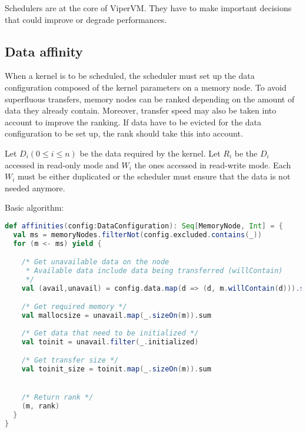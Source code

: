 Schedulers are at the core of ViperVM.
They have to make important decisions that could improve or degrade performances.

\subsection{Data affinity}
When a kernel is to be scheduled, the scheduler must set up the data configuration composed of the kernel parameters on a memory node.
To avoid superfluous transfers, memory nodes can be ranked depending on the amount of data they already contain.
Moreover, transfer speed may also be taken into account to improve the ranking.
If data have to be evicted for the data configuration to be set up, the rank should take this into account.

Let $D_i (0 \le i \le n)$ be the data required by the kernel.
Let $R_i$ be the $D_i$ accessed in read-only mode and $W_i$ the ones accessed in read-write mode.
Each $W_i$ must be either duplicated or the scheduler must ensure that the data is not needed anymore.

Basic algorithm:

\begin{lstlisting}[language=scala]
def affinities(config:DataConfiguration): Seq[MemoryNode, Int] = {
  val ms = memoryNodes.filterNot(config.excluded.contains(_))
  for (m <- ms) yield {

    /* Get unavailable data on the node
     * Available data include data being transferred (willContain)
     */
    val (avail,unavail) = config.data.map(d => (d, m.willContain(d))).split(_._2)

    /* Get required memory */
    val mallocsize = unavail.map(_.sizeOn(m)).sum
    
    /* Get data that need to be initialized */
    val toinit = unavail.filter(_.initialized)

    /* Get transfer size */
    val toinit_size = toinit.map(_.sizeOn(m)).sum


    /* Return rank */
    (m, rank)
  }
}
\end{lstlisting}
